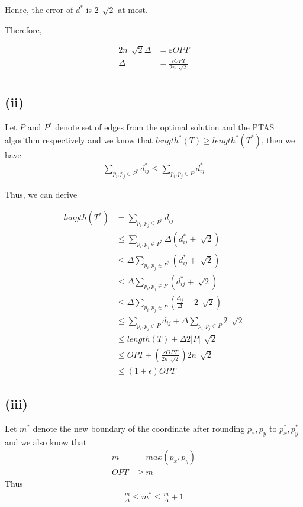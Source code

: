 
Hence, the error of $d^*$  is $2\,\sqrt[]{2}$ at most.

Therefore,

\begin{align*}
    2n\,\sqrt[]{2}\Delta &= \varepsilon OPT\\
    \Delta &= \frac{\varepsilon OPT}{2n\,\sqrt[]{2}}\\
\end{align*}

\subsection*{(ii)}

Let $P$ and $P^*$ denote set of edges from the optimal solution and the PTAS algorithm respectively and we know that $length^*(T) \geq length^*(T^*)$, then we have
\begin{align*}
	\sum_{p_{i},p_{j} \in P^*}{d^*_{ij}} \leq \sum_{p_{i},p_{j} \in P}{d^*_{ij}}
\end{align*}

Thus, we can derive

\begin{align*}
	length(T^*) &= \sum_{p_{i},p_{j} \in P^*}{d_{ij}} \\
	&\leq \sum_{p_{i},p_{j} \in  P^*}{\Delta(d^*_{ij}+\sqrt[]{2})}  \\
	&\leq \Delta \sum_{p_{i},p_{j} \in  P^*}{(d^*_{ij}+\sqrt[]{2})} \\
    &\leq \Delta \sum_{p_{i},p_{j} \in  P}{(d^*_{ij}+\sqrt[]{2})} \\
    &\leq \Delta \sum_{p_{i},p_{j} \in  P}{(\frac{d_{ij}}{\Delta}+2\,\sqrt[]{2})} \\
    &\leq \sum_{p_{i},p_{j} \in  P}{d_{ij}} + \Delta\sum_{p_{i},p_{j} \in  P}{2\,\sqrt[]{2}} \\
    &\leq length\left(T\right) + \Delta2|P|\,\sqrt[]{2} \\
    &\leq OPT + \left( \frac{\varepsilon OPT}{2n\,\sqrt[]{2}} \right) 2n\,\sqrt[]{2} \\
    &\leq (1 + \epsilon )OPT
\end{align*}


\subsection*{(iii)}

Let $m^*$ denote the new boundary of the coordinate after rounding $p_{x}, p_{y}$ to $p^*_{x}, p^*_{y}$
and we also know that
\begin{align*}
			m &= max(p_x,p_y ) \\
			OPT &\geq m
\end{align*}
Thus
\begin{align*}
			\frac{m}{\Delta} \leq m^* \leq \frac{m}{\Delta} + 1
\end{align*}

